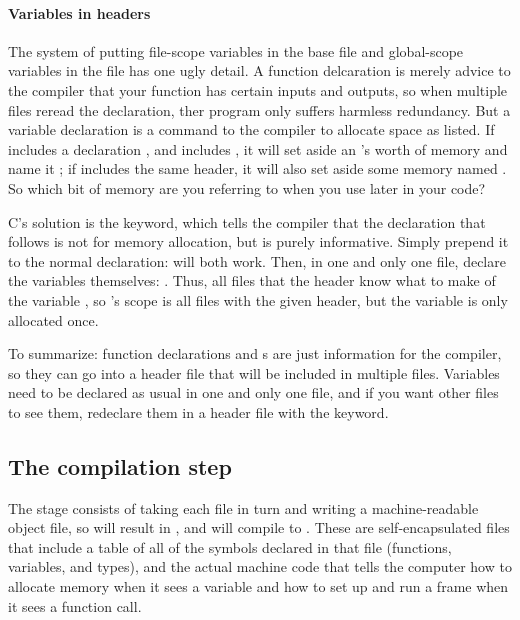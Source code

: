 \paragraph{\treesymbol Variables in headers} \label{extern} The system of
putting file-scope variables in the base  file and global-scope
variables in the  file has one ugly detail. A
function delcaration is merely advice to the compiler that your function
has certain inputs and outputs, so when multiple files reread the
declaration, ther program only suffers harmless redundancy. But a
variable declaration is a command to the compiler to allocate space as
listed. If  includes a declaration , and
 includes , it will set aside an
's worth of memory and name it ; if 
includes the same header, it will also set aside some memory
named . So which bit of memory are you referring to when you use
 later in your code? 

C's solution is the  keyword, which tells the compiler that
the declaration that follows is not for memory allocation, but is purely
informative. Simply prepend it to the normal declaration:  will both work. Then, in one and only one
 file, declare the variables themselves: . Thus, all files that  the header know what to make of
the variable , so 's scope is all files with the given
header, but the variable is only allocated once.

To summarize: function declarations and s are just information
for the compiler, so they can go into a header file that will be included
in multiple  files. Variables need to be declared as usual in
one and only one  file, and if you want other  files to
see them, redeclare them in a header file with the  keyword.

\subsection{The compilation step} 
The 
stage consists of taking each  file in turn and
writing a machine-readable object file, so  will
result in , and  will compile to
. These  are self-encapsulated
files that include a table of all of the symbols declared in that file
(functions, variables, and types), and 
the actual machine code that tells the computer how to allocate memory
when it sees a variable and how to set up and run a frame when it sees a
function call.

